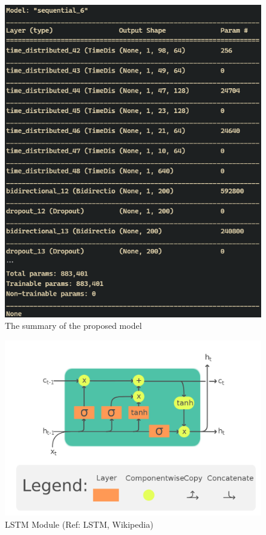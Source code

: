 \documentclass[conference]{IEEEtran}
\begin{document}
\begin{figure}[htbp]
\centerline{\includegraphics[scale=0.5]{model_arch-1.png}}
\caption{The summary of the proposed model}
\label{model}
\end{figure}

\begin{figure}[htbp]
	\centerline{\includegraphics[scale=0.17]{LSTM_Cell.png}}
	\caption{LSTM Module (Ref: LSTM, Wikipedia)}
	\label{modely}
\end{figure}
\end{document}
